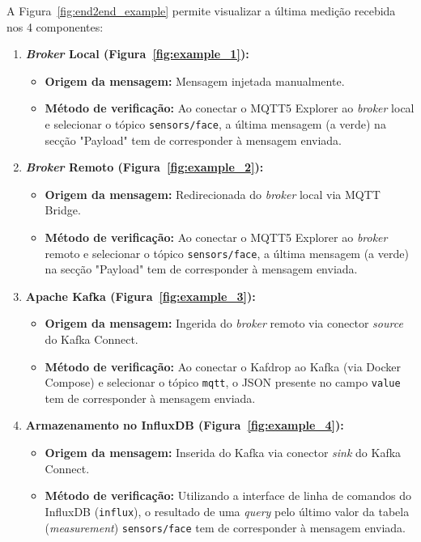 A Figura~\ref{fig:end2end_example} permite visualizar a última medição recebida nos 4 componentes:

\begin{enumerate}
    \item \textbf{\textit{Broker} Local (Figura~\ref{fig:example_1}):} 
    \begin{itemize}
        \item \textbf{Origem da mensagem:} Mensagem injetada manualmente.
        \item \textbf{Método de verificação:} Ao conectar o MQTT5 Explorer ao \textit{broker} local e selecionar o tópico \texttt{sensors/face}, a última mensagem (a verde) na secção "Payload" tem de corresponder à mensagem enviada.
    \end{itemize}
    
    \item \textbf{\textit{Broker} Remoto (Figura~\ref{fig:example_2}):} 
    \begin{itemize}
        \item \textbf{Origem da mensagem:} Redirecionada do \textit{broker} local via \ac{MQTT} Bridge.
        \item \textbf{Método de verificação:} Ao conectar o MQTT5 Explorer ao \textit{broker} remoto e selecionar o tópico \texttt{sensors/face}, a última mensagem (a verde) na secção "Payload" tem de corresponder à mensagem enviada.
    \end{itemize}
    
    \item \textbf{Apache Kafka (Figura~\ref{fig:example_3}):} 
    \begin{itemize}
        \item \textbf{Origem da mensagem:} Ingerida do \textit{broker} remoto via conector \textit{source} do Kafka Connect.
        \item \textbf{Método de verificação:} Ao conectar o Kafdrop ao Kafka (via Docker Compose) e selecionar o tópico \texttt{mqtt}\footnotemark, o \ac{JSON} presente no campo \texttt{value} tem de corresponder à mensagem enviada.
    \end{itemize}
    
    \item \textbf{Armazenamento no InfluxDB (Figura~\ref{fig:example_4}):} 
    \begin{itemize}
        \item \textbf{Origem da mensagem:} Inserida do Kafka via conector \textit{sink} do Kafka Connect.
        \item \textbf{Método de verificação:} Utilizando a interface de linha de comandos do InfluxDB (\texttt{influx}), o resultado de uma \textit{query} pelo último valor da tabela (\textit{measurement}) \texttt{sensors/face} tem de corresponder à mensagem enviada\footnotemark.
    \end{itemize}
\end{enumerate}

